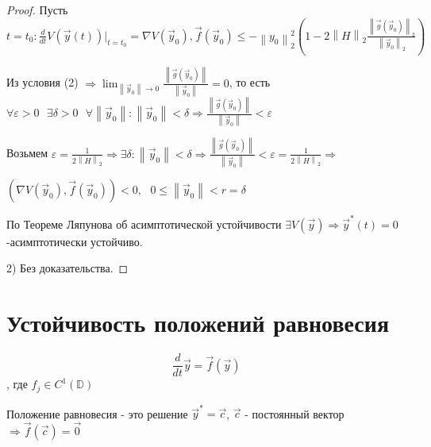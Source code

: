 \documentclass[12pt, a4paper]{report}
\begin{document}
\begin{proof}
    Пусть \( t = t_0 : \displaystyle  \frac{d}{dt }  V (\vec{ y}  (t )) |_{t = t_0 } = \nabla V (\vec{y } _0 ) , \vec{ f }  (\vec{ y }  _0 )   \le  - \left\lVert y_0    \right\rVert _2 ^2 \left( 1 - 2 \left\lVert H  \right\rVert _2 \frac{ \left\lVert \vec{ g } (\vec{ y } _0 ) \right\rVert _2 }{\left\lVert \vec{ y}  _0  \right\rVert _2 }  \right) \) 

    Из условия (2) \( \Rightarrow \displaystyle  \lim_{\left\lVert \vec{y }  _0      \right\rVert \to 0 } \frac{\left\lVert  \vec{g }  (\vec{ y} _0 ) \right\rVert}{\left\lVert \vec{ y}  _0  \right\rVert } =0   \), то есть \( \forall  \varepsilon > 0 \text{ }  \exists  \delta> 0 \text{ }  \forall  \left\lVert \vec{ y}  _0  \right\rVert : \left\lVert \vec{ y}  _0  \right\rVert < \delta \Rightarrow \displaystyle  \frac{ \left\lVert \vec{ g }  (\vec{ y }_ 0 ) \right\rVert}{\left\lVert  \vec{ y}  _0 \right\rVert} < \varepsilon   \) 

    Возьмем \( \displaystyle  \varepsilon = \frac{1}{ 2 \left\lVert H  \right\rVert _2 } \Rightarrow \exists  \delta : \left\lVert  \vec{ y}  _0  \right\rVert < \delta \Rightarrow \frac{ \left\lVert \vec{g }  (\vec{ y }  _0 ) \right\rVert}{\left\lVert \vec{ y } _0  \right\rVert} < \varepsilon = \frac{1}{2 \left\lVert H  \right\rVert _2 } \Rightarrow    \) 
    
    \( (\nabla V (\vec{ y}  _0 ), \vec{f }  ( \vec{ y }  _0 )) < 0  , \text{ }  0 \le  \left\lVert \vec{y }_0   \right\rVert < r = \delta \) 

    По Теореме Ляпунова об асимптотической устойчивости \( \exists  V (\vec{ y}  ) \Rightarrow \vec{ y}  ^*     (t ) = 0  \)  -асимптотически устойчиво.

    2) Без доказательства.

\end{proof}

\section{Устойчивость положений равновесия } 

\[ \frac{d}{dt } \vec{ y}  = \vec{f }  (\vec{ y } ) \tag{1}  \] 
, где \( f_j \in  C^1 (\mathbb{D}) \) 

\begin{definition}
    Положение равновесия -  это решение \( \vec{ y }^* = \vec{ c }  \), \( \vec{ c }  \) - постоянный вектор \( \Rightarrow \vec{f }  (\vec{ c } ) = \vec{ 0}  \) 
\end{definition}
\end{document}
